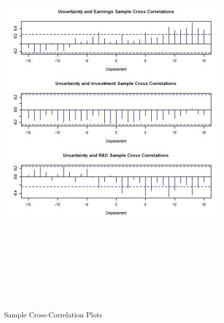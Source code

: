 \begin{figure}[H] 
\centering
\includegraphics[width=6in, height=8in]{figures/ccf}
\captionsetup{justification=centering, width=.95\textwidth} 
\caption{\footnotesize Sample Cross-Correlation Plots} \label{ccf-plots}
\end{figure} 
